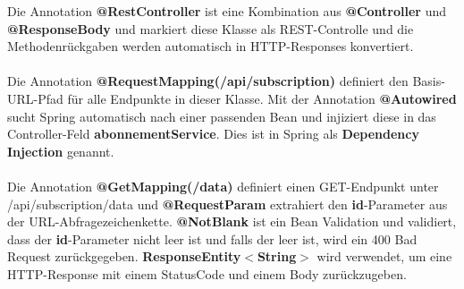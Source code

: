 \documentclass[a4paper,12pt]{scrreprt}
\begin{document}
Die Annotation \textbf{@RestController} ist eine Kombination aus \textbf{@Controller} und \textbf{@ResponseBody} und markiert diese Klasse als REST-Controlle und die Methodenrückgaben werden automatisch in HTTP-Responses konvertiert.\\ \\
Die Annotation \textbf{@RequestMapping(/api/subscription)} definiert den Basis-URL-Pfad für alle Endpunkte in dieser Klasse.
Mit der Annotation \textbf{@Autowired} sucht Spring automatisch nach einer passenden Bean und injiziert diese in das Controller-Feld \textbf{abonnementService}. Dies ist in Spring als \textbf{Dependency Injection} genannt.\\ \\
Die Annotation \textbf{@GetMapping(/data)} definiert einen GET-Endpunkt unter /api/subscription/data und \textbf{@RequestParam} extrahiert den \textbf{id}-Parameter aus der URL-Abfragezeichenkette. \textbf{@NotBlank} ist ein Bean Validation und validiert, dass der \textbf{id}-Parameter nicht leer ist und falls der leer ist, wird ein 400 Bad Request zurückgegeben. \textbf{ResponseEntity$<$String$>$} wird verwendet, um eine HTTP-Response mit einem StatusCode und einem Body zurückzugeben.
	
\end{document}
